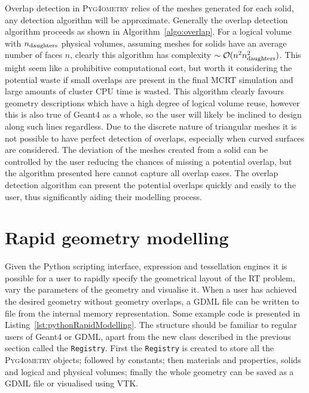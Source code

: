 \documentclass[final,5p,times,twocolumn]{elsarticle}
\newcommand{\PYGEOMETRY}{\textsc{Pyg4ometry}}
\begin{document}
Overlap detection in \PYGEOMETRY{} relies of the meshes generated for each solid, 
any detection algorithm will be approximate. Generally the overlap detection 
algorithm proceeds as shown in Algorithm~\ref{algo:overlap}.
For a logical volume with $n_{\rm daughters}$ physical volumes, assuming meshes for solids have an average number of faces $n$, clearly this algorithm 
has complexity $\sim \mathcal{O}(n^2 n_{\rm daughters}^2)$. This might seem like a prohibitive computational cost, but worth it considering the potential 
waste if small overlaps are present in the final MCRT simulation and large amounts of cluster CPU time is wasted. This algorithm clearly favours geometry 
descriptions which have a high degree of logical volume reuse, however this is also true of Geant4 as a whole, so the user will likely be inclined to design along such lines regardless.
Due to the discrete nature of triangular meshes it is not possible to have perfect detection 
of overlaps, especially when curved surfaces are considered. The deviation of the meshes created from a solid can be controlled by the user reducing the 
chances of missing a potential overlap, but the algorithm presented here cannot capture all overlap cases. The overlap detection algorithm can 
present the potential overlaps quickly and easily to the user, thus significantly aiding their modelling process. 

\section{Rapid geometry modelling}
Given the Python scripting interface, expression  and tessellation engines it is possible for a user to rapidly specify the geometrical layout of the RT problem, vary 
the parameters of the geometry and visualise it.  When a user has achieved the desired geometry without geometry overlaps, a GDML file can be written to file 
from the internal memory representation. Some example code is presented in Listing~\ref{lst:pythonRapidModelling}. The structure should be familiar to regular 
users of Geant4 or GDML, apart from the new class described in the previous section called the \verb|Registry|. First the \verb|Registry| is created to store all 
the \PYGEOMETRY{} objects; followed by constants;  then materials and properties, solids and logical and physical volumes; finally the whole geometry can be saved
as a GDML file or visualised using VTK.
\end{document}
